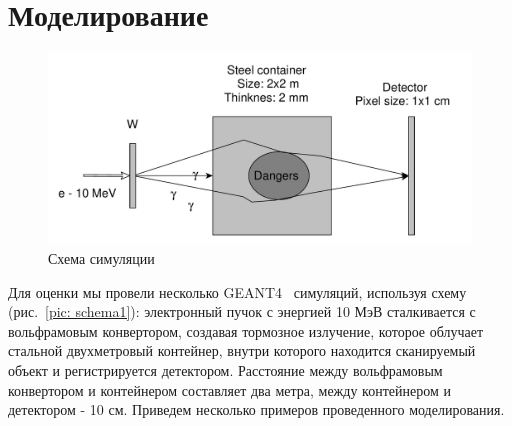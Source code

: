 \documentclass[a4paper]{panl}
\begin{document}
\section*{Моделирование}
\begin{figure}[t]
    \begin{center}
        \includegraphics[width=120mm]{figures/yed_schema_1.pdf}
        \vspace{-3mm}
        \caption{Схема симуляции}
    \end{center}
    \vspace{-5mm}
\end{figure}
Для оценки мы провели несколько GEANT4~\cite{ALLISON2016186} симуляций, используя схему (рис.~\ref{pic: schema1}): электронный пучок с энергией 10 МэВ сталкивается с вольфрамовым конвертором, создавая тормозное излучение, которое облучает стальной двухметровый контейнер, внутри которого находится сканируемый объект и регистрируется детектором. Расстояние между вольфрамовым конвертором и контейнером составляет два метра, между контейнером и детектором - 10 см. Приведем несколько примеров проведенного моделирования.
\end{document}
